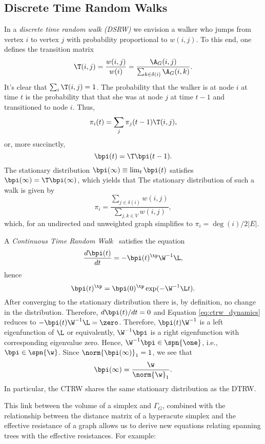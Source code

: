 \subsection{Discrete Time Random Walks}
In a \emph{discrete time random walk (DSRW)} we envision a walker who jumps from vertex $i$ to vertex $j$ with probability proportional to $w(i,j)$. To this end, one defines the transition matrix 
\begin{equation*}
\T(i,j) = \frac{w(i,j)}{w(i)}=\frac{\A_G(i,j)}{\sum_{k\in\delta(i)} \A_G(i,k)}.
\end{equation*}
It's clear that $\sum_i \T(i,j)=1$. 
The probability that the walker is at node $i$ at time $t$ is the probability that that she was at node $j$ at time $t-1$ and transitioned to node $i$. Thus, 
\begin{equation*}
\pi_i(t)=\sum_{j}\pi_j(t-1)\T(i,j),
\end{equation*}
or, more succinctly, 
\begin{equation*}
\bpi(t) = \T\bpi(t-1).
\end{equation*}
The stationary distribution $\bpi(\infty)\equiv \lim_t \bpi(t)$  satisfies $\bpi(\infty)=\T\bpi(\infty)$,  which yields that 
The stationary distribution of such a walk is given by 
\[\pi_i = \frac{\sum_{j\in \delta(i)} w(i,j)}{\sum_{j,k\in V}w(i,j)},\]
which, for an undirected and unweighted graph simplifies to $\pi_i=\deg(i)/2|E|$. 


A \emph{Continuous Time Random Walk}~\cite{masuda2017random} satisfies the equation 
\begin{equation}
\label{eq:ctrw_dynamics}
\frac{d\bpi(t)}{dt}= -\bpi(t)^\tp\W^{-1} \L,
\end{equation}
hence 
\begin{equation*}
\bpi(t)^\tp = \bpi(0)^\tp \exp(-\W^{-1}\L t).
\end{equation*}
After converging to the stationary distribution there is, by definition, no change in the distribution. Therefore, $d\bpi(t)/dt=0$ and Equation \eqref{eq:ctrw_dynamics} reduces to 
$-\bpi(t)\W^{-1}\L =\zero$. Therefore, $\bpi(t)\W^{-1}$ is a left eigenfunction of $\L$ or equivalently, $ \W^{-1}\bpi$ is a right eigenfunction with corresponding eigenvalue zero. Hence, $\W^{-1}\bpi\in\spn\{\one\}$, i.e., $\bpi\in\spn\{\w\}$. Since $\norm{\bpi(\infty)}_1=1$, we see that 
\[\bpi(\infty) = \frac{\w}{\norm{\w}_1}.\]
In particular, the CTRW shares the same stationary distribution as the DTRW. 




This link between the volume of a simplex and $\Gamma_G$,  combined with the relationship between the distance matrix of a hyperacute simplex and the effective resistance of a graph allows us to derive new equations relating spanning trees with the effective resistances. For example: 

